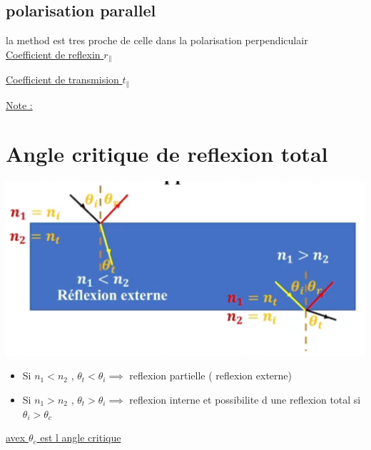 \documentclass[12pt]{book}
\begin{document}
            \subsection{polarisation parallel}
                la method est tres proche de celle dans la polarisation perpendiculair \\
                \underline{Coefficient de reflexin $r_\parallel$}
                \begin{center}
                \end{center}
                \underline{Coefficient de transmision $t_\parallel$}
                \begin{center}
                \end{center}
                \underline{Note :} \\
                \begin{center}
                \end{center}
                \pagebreak
        \section{Angle critique de reflexion total}
            \includegraphics[]{pic/anglecritique.png}
            \begin{itemize}
                \item Si $n_1 < n_2$ , $\theta_t < \theta_i \implies $ reflexion partielle ( reflexion externe)
                \item Si $n_1 > n_2$ , $\theta_t > \theta_i \implies $ reflexion interne et possibilite d une reflexion total si $\theta_i > \theta_c$
            \end{itemize}
            \underline{avex $\theta_c$ est l angle critique}
\end{document}
